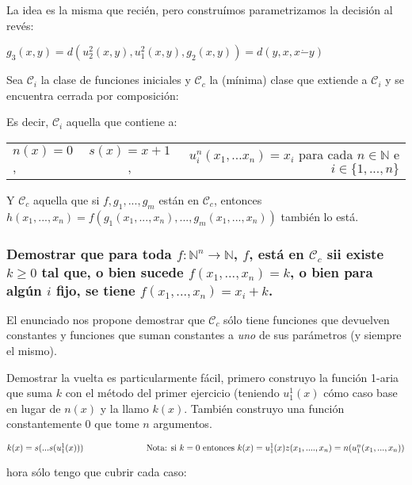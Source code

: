 \documentclass[11pt]{article} %
\newcommand{\desarrollo}[2]{

\hspace{2em}\parbox{\textwidth}{#1}

}
\newcommand{\nat}{\mathbb{N}}
\newcommand{\Ccur}{\mathcal{C}}
\begin{document}
La idea es la misma que recién, pero construímos parametrizamos la decisión al revés:

\desarrollo{$
g_3(x,y) = d(u^2_2(x,y), u^2_1(x,y), g_2(x,y)) = d(y, x, x \dot- y)
$}

\subsection{Sea $\Ccur_i$ la clase de funciones iniciales y $\Ccur_c$ la (mínima) clase que extiende a $\Ccur_i$ y se encuentra cerrada por composición:}

Es decir, $\Ccur_i$ aquella que contiene a:

\begin{tabular}{lcr}
$n(x)=0$, &
$s(x)=x+1$, &
$u^n_i(x_1,...x_n)=x_i$ para cada $n \in \nat$ e $i \in \{1, ..., n\}$
\end{tabular}

Y $\Ccur_c$ aquella que si $f, g_1, ..., g_m$ están en $\Ccur_c$, entonces $h(x_1, ..., x_n) = f(g_1(x_1, ..., x_n), ..., g_m(x_1, ..., x_n))$ también lo está.

\subsubsection{Demostrar que para toda $f: \nat^n \to \nat$, $f$, está en $\Ccur_c$ sii existe $k \geq 0$ tal que, o bien sucede $f(x_1, ..., x_n) = k$, o bien para algún $i$ fijo, se tiene $f(x_1, ..., x_n) = x_i + k$.}

El enunciado nos propone demostrar que $\Ccur_c$ sólo tiene funciones que devuelven constantes y funciones que suman constantes a \emph{uno} de sus parámetros (y siempre el mismo).

Demostrar la vuelta es particularmente fácil, primero construyo la función 1-aria que suma $k$ con el método del primer ejercicio (teniendo $u^1_1(x)$ cómo caso base en lugar de $n(x)$ y la llamo $k(x)$. También construyo una función constantemente 0 que tome $n$ argumentos.

\desarrollo{$
k(x) = s(...s(u^1_1(x))) \text{\hspace{7em} Nota: si $k=0$ entonces } k(x)=u^1_1(x) \\
z(x_1, ...., x_n) = n(u^n_1(x_1, ..., x_n))
$}

Ahora sólo tengo que cubrir cada caso:
\end{document}
